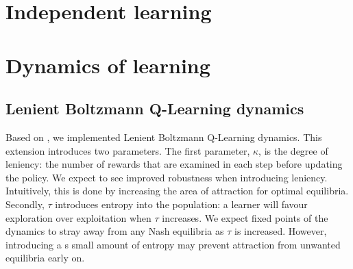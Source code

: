 \documentclass[10pt,a4paper]{article}
\begin{document}
\section{Independent learning}
\section{Dynamics of learning}

\subsection{Lenient Boltzmann Q-Learning dynamics}
Based on \citet{evoldynamics}, we implemented Lenient Boltzmann Q-Learning dynamics. This extension introduces two parameters. The first parameter, $\kappa$, is the degree of leniency: the number of rewards that are examined in each step before updating the policy. We expect to see improved robustness when introducing leniency. Intuitively, this is done by increasing the area of attraction for optimal equilibria. Secondly, $\tau$ introduces entropy into the population: a learner will favour exploration over exploitation when $\tau$ increases. We expect fixed points of the dynamics to stray away from any Nash equilibria as $\tau$ is increased. However, introducing a s small amount of entropy may prevent attraction from unwanted equilibria early on.
\end{document}
